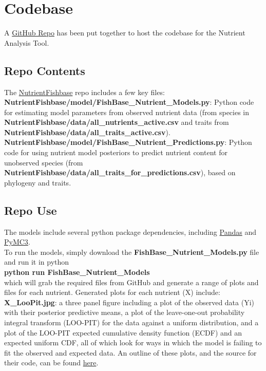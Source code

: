 \documentclass{article}
\begin{document}
\section{Codebase}

A \href{https://github.com/mamacneil/NutrientFishbase}{GitHub Repo} has been put together to host the codebase for the Nutrient Analysis Tool. 

\subsection{Repo Contents}

The \href{https://github.com/mamacneil/NutrientFishbase}{NutrientFishbase} repo includes a few key files:\\

{\bf NutrientFishbase/model/FishBase\_Nutrient\_Models.py}:  Python code for estimating model parameters from observed nutrient data (from species in {\bf NutrientFishbase/data/all\_nutrients\_active.csv} and traits from {\bf NutrientFishbase/data/all\_traits\_active.csv}).\\

{\bf NutrientFishbase/model/FishBase\_Nutrient\_Predictions.py}: Python code for using nutrient model posteriors to predict nutrient content for unobserved species (from {\bf NutrientFishbase/data/all\_traits\_for\_predictions.csv}), based on phylogeny and traits.

\subsection{Repo Use}

The models include several python package dependencies, including \href{https://pandas.pydata.org/}{Pandas} and \href{https://docs.pymc.io/}{PyMC3}.\\

To run the models, simply download the {\bf FishBase\_Nutrient\_Models.py} file and run it in python\\

{\bf python run FishBase\_Nutrient\_Models}\\

which will grab the required files from GitHub and generate a range of plots and files for each nutrient. Generated plots for each nutrient (X) include:\\

{\bf X\_LooPit.jpg}:  a three panel figure including a plot of the observed data (Yi) with their posterior predictive means, a plot of the leave-one-out probability integral transform (LOO-PIT) for the data against a uniform distribution, and a plot of the LOO-PIT expected cumulative density function (ECDF) and an expected uniform CDF, all of which look for ways in which the model is failing to fit the observed and expected data. An outline of these plots, and the source for their code, can be found \href{https://oriolabril.github.io/oriol_unraveled/python/arviz/pymc3/2019/07/31/loo-pit-tutorial.html}{here}.\\
\end{document}
